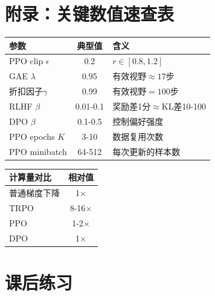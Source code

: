 \documentclass[11pt,a4paper]{article}
\theoremstyle{definition}
\begin{document}
\section*{附录：关键数值速查表}

\begin{center}
\begin{tabular}{l|c|l}
\toprule
\textbf{参数} & \textbf{典型值} & \textbf{含义} \\
\midrule
PPO clip $\epsilon$ & 0.2 & $r \in [0.8, 1.2]$ \\
GAE $\lambda$ & 0.95 & 有效视野$\approx 17$步 \\
折扣因子$\gamma$ & 0.99 & 有效视野$= 100$步 \\
RLHF $\beta$ & 0.01-0.1 & 奖励差1分$\approx$KL差10-100 \\
DPO $\beta$ & 0.1-0.5 & 控制偏好强度 \\
PPO epochs $K$ & 3-10 & 数据复用次数 \\
PPO minibatch & 64-512 & 每次更新的样本数 \\
\bottomrule
\end{tabular}
\end{center}

\begin{center}
\begin{tabular}{l|c}
\toprule
\textbf{计算量对比} & \textbf{相对值} \\
\midrule
普通梯度下降 & 1$\times$ \\
TRPO & 8-16$\times$ \\
PPO & 1-2$\times$ \\
DPO & 1$\times$ \\
\bottomrule
\end{tabular}
\end{center}

\section*{课后练习}
\end{document}
